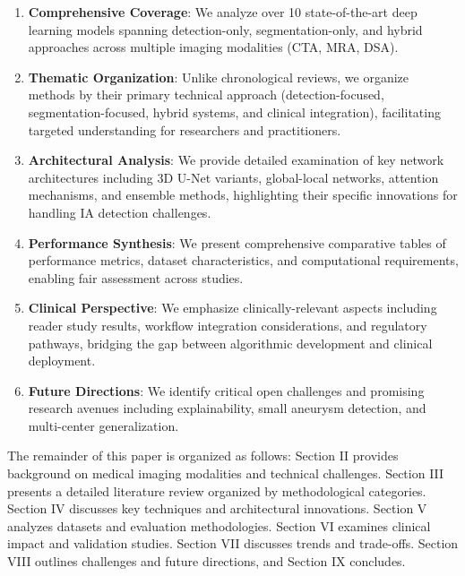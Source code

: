 \documentclass[conference]{IEEEtran}
\begin{document}
\begin{enumerate}
    \item \textbf{Comprehensive Coverage}: We analyze over 10 state-of-the-art deep learning models spanning detection-only, segmentation-only, and hybrid approaches across multiple imaging modalities (CTA, MRA, DSA).
    
    \item \textbf{Thematic Organization}: Unlike chronological reviews, we organize methods by their primary technical approach (detection-focused, segmentation-focused, hybrid systems, and clinical integration), facilitating targeted understanding for researchers and practitioners.
    
    \item \textbf{Architectural Analysis}: We provide detailed examination of key network architectures including 3D U-Net variants, global-local networks, attention mechanisms, and ensemble methods, highlighting their specific innovations for handling IA detection challenges.
    
    \item \textbf{Performance Synthesis}: We present comprehensive comparative tables of performance metrics, dataset characteristics, and computational requirements, enabling fair assessment across studies.
    
    \item \textbf{Clinical Perspective}: We emphasize clinically-relevant aspects including reader study results, workflow integration considerations, and regulatory pathways, bridging the gap between algorithmic development and clinical deployment.
    
    \item \textbf{Future Directions}: We identify critical open challenges and promising research avenues including explainability, small aneurysm detection, and multi-center generalization.
\end{enumerate}

The remainder of this paper is organized as follows: Section II provides background on medical imaging modalities and technical challenges. Section III presents a detailed literature review organized by methodological categories. Section IV discusses key techniques and architectural innovations. Section V analyzes datasets and evaluation methodologies. Section VI examines clinical impact and validation studies. Section VII discusses trends and trade-offs. Section VIII outlines challenges and future directions, and Section IX concludes.
\end{document}
